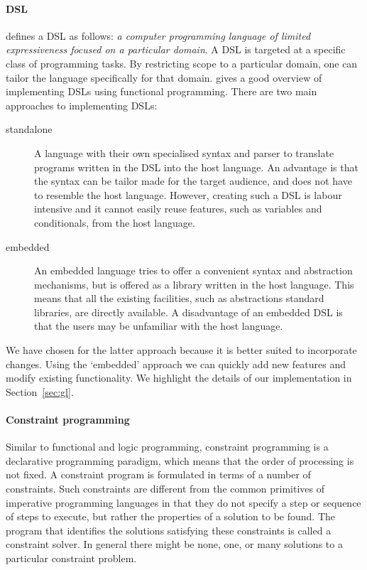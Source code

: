 \paragraph{\acl{DSL}} \citet{fowler} defines a \ac{DSL} as follows:
%
\emph{a computer programming language of limited expressiveness
  focused on a particular domain}.
%
A \ac{DSL} is targeted at a specific class of programming tasks.
%
By restricting scope to a particular domain, one can tailor the
language specifically for that domain.
%
\citet{Gibbons2015} gives a good overview of implementing \acp{DSL}
using functional programming.
%
There are two main approaches to implementing \acp{DSL}:
\begin{description}
\item[standalone] A language with their own specialised syntax and
  parser to translate programs written in the \ac{DSL} into the host
  language.
%
  An advantage is that the syntax can be tailor made for the target
  audience, and does not have to resemble the host language.
%
  However, creating such a \ac{DSL} is labour intensive and it cannot
  easily reuse features, such as variables and conditionals, from the
  host language.
\item[embedded] An embedded language tries to offer a convenient
  syntax and abstraction mechanisms, but is offered as a library
  written in the host language.
%
  This means that all the existing facilities, such as abstractions
  standard libraries, are directly available.
%
  A disadvantage of an embedded \ac{DSL} is that the users may be
  unfamiliar with the host language.
\end{description}
%
We have chosen for the latter approach because it is better suited
to incorporate changes. Using the `embedded' approach we can quickly
add new features and modify existing functionality. We highlight the 
details of our implementation in Section~\ref{sec:gl}.


\paragraph{Constraint programming} Similar to functional and logic
programming, constraint programming is a declarative programming
paradigm, which means that the order of processing is not fixed.
%
A constraint program is formulated in terms of a number of
constraints.
%
Such constraints are different from the common primitives of
imperative programming languages in that they do not specify a step or
sequence of steps to execute, but rather the properties of a solution
to be found.
%
The program that identifies the solutions satisfying these constraints
is called a constraint solver.
%
In general there might be none, one, or many solutions to a particular
constraint problem.

